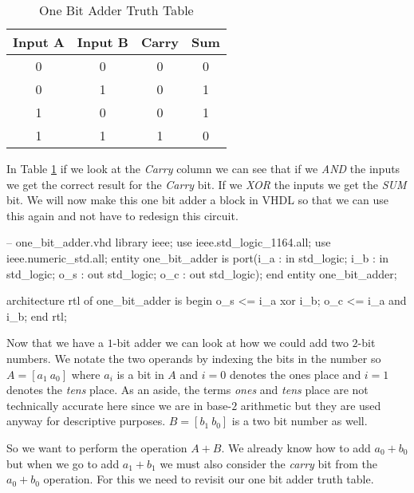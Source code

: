 \begin{table}[h!]  
\begin{center}    
\caption{One Bit Adder Truth Table} 
\label{tab:tt2ba} 
\begin{tabular}{|c|c|c|c|}  
\textbf{Input A} & \textbf{Input B} & \textbf{Carry} & \textbf{Sum}\\  
\hline  
0 & 0 & 0 & 0\\  
0 & 1 & 0 & 1\\  
1 & 0 & 0 & 1\\  
1 & 1 & 1 & 0\\ 
\end{tabular}  
\end{center}
\end{table}
	
In Table \ref{tab:tt2ba} if we look at the \emph{Carry} column we can see that if we \emph{AND} the inputs we get the correct result for the \emph{Carry} bit. If we \emph{XOR} the inputs we get the \emph{SUM} bit. We will now make this one bit adder a block in \ac{VHDL} so that we can use this again and not have to redesign this circuit.

\begin{VHDLlisting}[tabsize=4]
-- one_bit_adder.vhd
library ieee; 
    use ieee.std_logic_1164.all; 
    use ieee.numeric_std.all; 
entity one_bit_adder is
port(i_a : in    std_logic;  
     i_b : in    std_logic;  
     o_s :   out std_logic;  
     o_c :   out std_logic);
end entity one_bit_adder;

architecture rtl of one_bit_adder is
begin 
    o_s <= i_a xor i_b; 
    o_c <= i_a and i_b;
end rtl;
\end{VHDLlisting}

Now that we have a $1$-bit adder we can look at how we could add two $2$-bit numbers. We notate the two operands by indexing the bits in the number so $A=[a_1~a_0]$ where $a_i$ is a bit in $A$ and $i=0$ denotes the ones place and $i=1$ denotes the \emph{tens} place. As an aside, the terms \emph{ones} and \emph{tens} place are not technically accurate here since we are in base-$2$ arithmetic but they are used anyway for descriptive purposes. $B=[b_1~b_0]$ is a two bit number as well.

So we want to perform the operation $A+B$. We already know how to add $a_0+b_0$ but when we go to add $a_1+b_1$ we must also consider the \emph{carry} bit from the $a_0+b_0$ operation. For this we need to revisit our one bit adder truth table.

